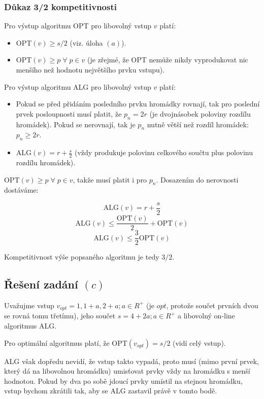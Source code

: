 \documentclass[a4paper, 12pt]{article}
\begin{document}
  \subsubsection{Důkaz 3/2 kompetitivnosti}
  Pro výstup algoritmu OPT pro libovolný vstup $v$ platí:
  \begin{itemize}
    \item OPT$(v) \ge s/2$ (viz. úloha $(a)$).
    \item OPT$(v) \ge p \; \forall \; p \in v$ (je zřejmé, že OPT nemůže nikdy vyprodukovat nic menšího než hodnotu největšího prvku vstupu).
  \end{itemize}

  Pro výstup algoritmu ALG pro libovolný vstup $v$ platí:
  \begin{itemize}
    \item Pokud se před přidáním posledního prvku hromádky rovnají, tak pro poslední prvek posloupnosti musí platit, že $p_n=2r$ (je dvojnásobek poloviny rozdílu hromádek). Pokud se nerovnají, tak je $p_n$ nutně větší než rozdíl hromádek: $p_n \ge 2r$.
    \item ALG$(v)=r+\frac{s}{2}$ (vždy produkuje polovinu celkového součtu plus polovinu rozdílu hromádek).
  \end{itemize}

  OPT$(v) \ge p \; \forall \; p \in v$, takže musí platit i pro $p_n$. Dosazením do nerovnosti dostáváme:

  $$\text{ALG}(v)=r+\frac{s}{2}$$
  $$\text{ALG}(v) \le \frac{\text{OPT}(v)}{2}+\text{OPT}(v)$$
  $$\text{ALG}(v) \le \frac{3}{2}\text{OPT}(v)$$

  Kompetitivnost výše popsaného algoritmu je tedy $3/2$.

  \subsection{Řešení zadání $(c)$}
  Uvažujme vstup $v_{opt}=1,1+a,2+a; a \in R^+$ (je $opt$, protože součet prvních dvou se rovná tomu třetímu), jeho součet $s=4+2a; a \in R^+$ a libovolný on-line algoritmus ALG.

  Pro optimální algoritmus platí, že OPT$(v_{opt})=s/2$ (vidí celý vstup).

  ALG však dopředu nevidí, že vstup takto vypadá, proto musí (mimo první prvek, který dá na libovolnou hromádku) umisťovat prvky vždy na hromádku s menší hodnotou. Pokud by dva po sobě jdoucí prvky umístil na stejnou hromádku, vstup bychom zkrátili tak, aby se ALG zastavil právě v tomto bodě.
\end{document}
